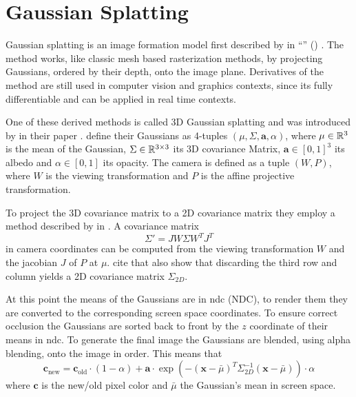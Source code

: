 \documentclass[a4paper, 11pt]{memoir}
\begin{document}
    \section{Gaussian Splatting}
    \label{sec:splatting}
    Gaussian splatting is an image formation model first described by \citeauthor{splatting} in \enquote{}
    (\citeyear{splatting}) \cite{splatting}. The method works, like classic mesh based rasterization methods, by projecting
    Gaussians, ordered by their depth, onto the image plane. Derivatives of the method are still used in computer vision
    and graphics contexts, since its fully differentiable and can be applied in real time contexts.

    One of these derived methods is called 3D Gaussian splatting and was introduced by \citeauthor{kerbl3Dgaussians} in
    their \citeyear{kerbl3Dgaussians} paper \cite{kerbl3Dgaussians}. \citeauthor{splatting}
    define their Gaussians as 4-tuples $(\mu, \Sigma, \mathbf{a}, \alpha)$, where $\mu \in \mathbb{R}^3$ is the mean of the
    Gaussian, $\Sigma \in \mathbb{R}^{3\times 3}$ its 3D covariance Matrix, $\mathbf{a} \in [0, 1]^3$ its albedo and
    $\alpha \in [0, 1]$ its opacity. The camera is defined as a tuple $(W, P)$, where $W$ is the viewing transformation
    and $P$ is the affine projective transformation.

    To project the 3D covariance matrix to a 2D covariance matrix they employ a method described by \citeauthor{volume_splatting}
    in \cite{volume_splatting}. A covariance matrix
    \begin{equation}
        \Sigma' = JW\Sigma W^TJ^T
    \end{equation}
    in camera coordinates can be computed from the viewing transformation $W$ and the jacobian $J$ of $P$ at $\mu$.
    \citeauthor{kerbl3Dgaussians} cite that \citeauthor{volume_splatting} also show that discarding the third row and
    column yields a 2D covariance matrix $\Sigma_{2D}$.

    At this point the means of the Gaussians are in \gls{ndc} (NDC), to render them they are converted to the corresponding
    screen space coordinates. To ensure correct occlusion the Gaussians are sorted back to front by the $z$ coordinate of
    their means in \gls{ndc}. To generate the final image the Gaussians are blended, using alpha blending, onto the image
    in order. This means that
    \begin{equation}
        \mathbf{c}_{\text{new}} = \mathbf{c}_{\text{old}} \cdot (1 - \alpha) + \mathbf{a} \cdot \exp{\left(-(\mathbf{x} - \bar{\mu})^T\Sigma_{2D}^{-1}(\mathbf{x} - \bar{\mu})\right)} \cdot \alpha
    \end{equation}
    where $\mathbf{c}$ is the new/old pixel color and $\bar{\mu}$ the Gaussian's mean in screen space.
\end{document}
